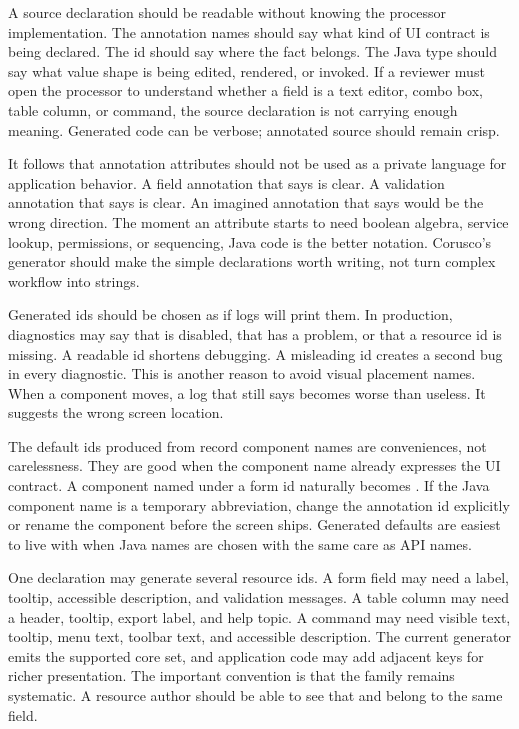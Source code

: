 A source declaration should be readable without knowing the processor
implementation. The annotation names should say what kind of UI contract is
being declared. The id should say where the fact belongs. The Java type should
say what value shape is being edited, rendered, or invoked. If a reviewer must
open the processor to understand whether a field is a text editor, combo box,
table column, or command, the source declaration is not carrying enough
meaning. Generated code can be verbose; annotated source should remain crisp.

It follows that annotation attributes should not be used as a private language
for application behavior. A field annotation that says  is
clear. A validation annotation that says  is clear. An
imagined annotation that says  would be the wrong direction. The moment an attribute starts to
need boolean algebra, service lookup, permissions, or sequencing, Java code is
the better notation. Corusco's generator should make the simple declarations
worth writing, not turn complex workflow into strings.

Generated ids should be chosen as if logs will print them. In production,
diagnostics may say that  is disabled, that
 has a problem, or that a
resource id is missing. A readable id shortens debugging. A misleading id
creates a second bug in every diagnostic. This is another reason to avoid
visual placement names. When a component moves, a log that still says
 becomes worse than useless. It suggests the wrong
screen location.

The default ids produced from record component names are conveniences, not
carelessness. They are good when the component name already expresses the UI
contract. A component named  under a form id
 naturally becomes . If the
Java component name is a temporary abbreviation, change the annotation id
explicitly or rename the component before the screen ships. Generated defaults
are easiest to live with when Java names are chosen with the same care as API
names.

One declaration may generate several resource ids. A form field may need a
label, tooltip, accessible description, and validation messages. A table column
may need a header, tooltip, export label, and help topic. A command may need
visible text, tooltip, menu text, toolbar text, and accessible description.
The current generator emits the supported core set, and application code may
add adjacent keys for richer presentation. The important convention is that
the family remains systematic. A resource author should be able to see that
 and  belong to the
same field.

